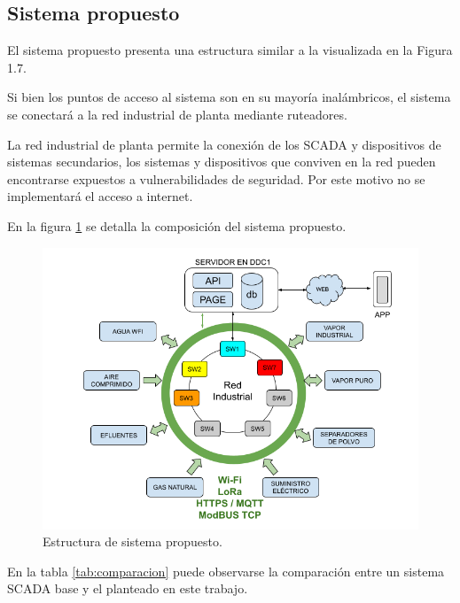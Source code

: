  
 \subsection{Sistema propuesto}

El sistema propuesto presenta una estructura similar a la visualizada en la Figura 1.7.

Si bien los puntos de acceso al sistema son en su mayoría inalámbricos, el sistema se conectará a la red industrial de planta mediante ruteadores. 

La red industrial de planta permite la conexión de los SCADA y dispositivos de sistemas secundarios, los sistemas y dispositivos que conviven en la red pueden encontrarse expuestos a vulnerabilidades de seguridad. Por este motivo no se implementará el acceso a internet.


En la figura \ref{fig:SCPROY} se detalla la composición del sistema propuesto.

\begin{figure}[htbp]
	\centering
	\includegraphics[width=1.05\textwidth]{./Figures/RED.png}
	\caption{Estructura de sistema propuesto.}
	\label{fig:SCPROY}
\end{figure}

En la tabla \ref{tab:comparacion} puede observarse la comparación entre un sistema SCADA base y el planteado en este trabajo.

